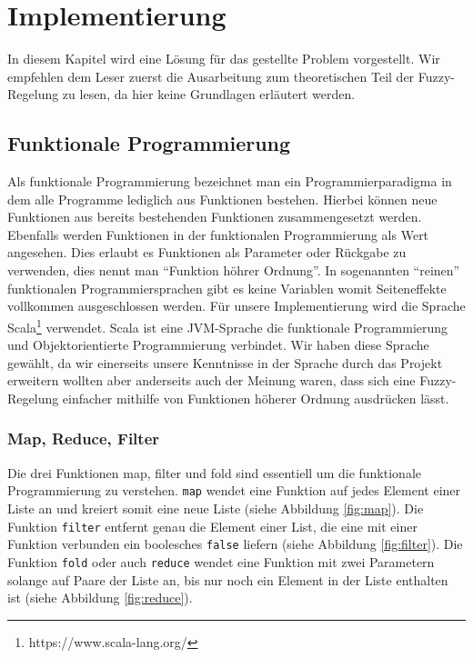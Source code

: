 \documentclass[12pt,a4paper,bibliography=totocnumbered,listof=totocnumbered, abstracton]{scrartcl}
\def\code#1{\texttt{#1}}
\theoremstyle{Umgebung}
\begin{document}
\section{Implementierung}

In diesem Kapitel wird eine Lösung für das gestellte Problem vorgestellt. Wir empfehlen dem Leser zuerst die Ausarbeitung zum theoretischen Teil der Fuzzy-Regelung zu lesen, da hier keine Grundlagen erläutert werden.

\subsection{Funktionale Programmierung}

Als funktionale Programmierung bezeichnet man ein Programmierparadigma in dem alle Programme lediglich aus Funktionen bestehen. Hierbei können neue Funktionen aus bereits bestehenden Funktionen zusammengesetzt werden. Ebenfalls werden Funktionen in der funktionalen Programmierung als Wert angesehen. Dies erlaubt es Funktionen als Parameter oder Rückgabe zu verwenden, dies nennt man \enquote{Funktion höhrer Ordnung}. In sogenannten \enquote{reinen} funktionalen Programmiersprachen gibt es keine Variablen womit Seiteneffekte vollkommen ausgeschlossen werden. Für unsere Implementierung wird die Sprache Scala\footnote{https://www.scala-lang.org/} verwendet. Scala ist eine JVM-Sprache die funktionale Programmierung und Objektorientierte Programmierung verbindet. Wir haben diese Sprache gewählt, da wir einerseits unsere Kenntnisse in der Sprache durch das Projekt erweitern wollten aber anderseits auch der Meinung waren, dass sich eine Fuzzy-Regelung einfacher mithilfe von Funktionen höherer Ordnung ausdrücken lässt.

\subsubsection{Map, Reduce, Filter}

Die drei Funktionen map, filter und fold sind essentiell um die funktionale Programmierung zu verstehen. \code{map} wendet eine Funktion auf jedes Element einer Liste an und kreiert somit eine neue Liste (siehe Abbildung \ref{fig:map}). Die Funktion \code{filter} entfernt genau die Element einer List, die eine mit einer Funktion verbunden ein boolesches \code{false} liefern (siehe Abbildung \ref{fig:filter}). Die Funktion \code{fold} oder auch \code{reduce} wendet eine Funktion mit zwei Parametern solange auf Paare der Liste an, bis nur noch ein Element in der Liste enthalten ist (siehe Abbildung \ref{fig:reduce}).
\end{document}
